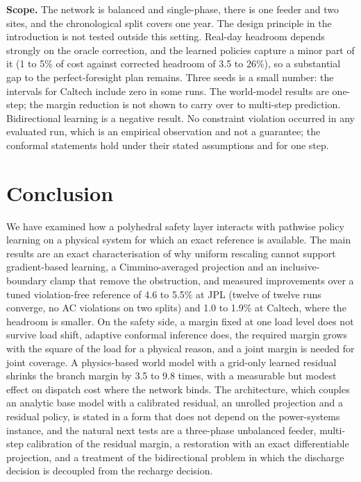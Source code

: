 \documentclass[11pt]{article}
\begin{document}
\textbf{Scope.} The network is balanced and single-phase, there is one feeder and two sites, and the chronological split covers one year. The design principle in the introduction is not tested outside this setting. Real-day headroom depends strongly on the oracle correction, and the learned policies capture a minor part of it (1 to 5\% of cost against corrected headroom of 3.5 to 26\%), so a substantial gap to the perfect-foresight plan remains. Three seeds is a small number: the intervals for Caltech include zero in some runs. The world-model results are one-step; the margin reduction is not shown to carry over to multi-step prediction. Bidirectional learning is a negative result. No constraint violation occurred in any evaluated run, which is an empirical observation and not a guarantee; the conformal statements hold under their stated assumptions and for one step.

\section{Conclusion}\label{sec:concl}
We have examined how a polyhedral safety layer interacts with pathwise policy learning on a physical system for which an exact reference is available. The main results are an exact characterisation of why uniform rescaling cannot support gradient-based learning, a Cimmino-averaged projection and an inclusive-boundary clamp that remove the obstruction, and measured improvements over a tuned violation-free reference of 4.6 to 5.5\% at JPL (twelve of twelve runs converge, no AC violations on two splits) and 1.0 to 1.9\% at Caltech, where the headroom is smaller. On the safety side, a margin fixed at one load level does not survive load shift, adaptive conformal inference does, the required margin grows with the square of the load for a physical reason, and a joint margin is needed for joint coverage. A physics-based world model with a grid-only learned residual shrinks the branch margin by 3.5 to 9.8 times, with a measurable but modest effect on dispatch cost where the network binds. The architecture, which couples an analytic base model with a calibrated residual, an unrolled projection and a residual policy, is stated in a form that does not depend on the power-systems instance, and the natural next tests are a three-phase unbalanced feeder, multi-step calibration of the residual margin, a restoration with an exact differentiable projection, and a treatment of the bidirectional problem in which the discharge decision is decoupled from the recharge decision.
\end{document}
